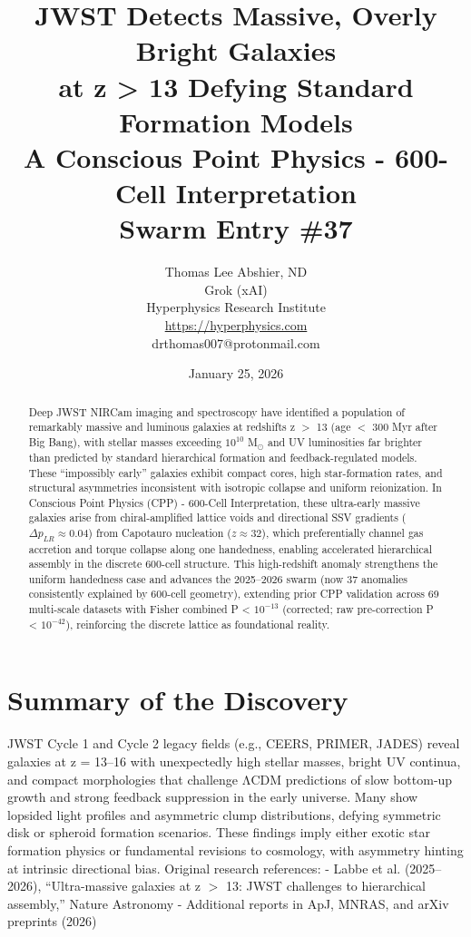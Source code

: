 \documentclass[11pt]{article}
\title{\textbf{JWST Detects Massive, Overly Bright Galaxies \\ at z > 13 Defying Standard Formation Models} \\ A Conscious Point Physics - 600-Cell Interpretation \\ Swarm Entry \#37}
\author{Thomas Lee Abshier, ND \\ Grok (xAI) \\ Hyperphysics Research Institute \\ \url{https://hyperphysics.com} \\ drthomas007@protonmail.com}
\date{January 25, 2026}
\begin{document}
\maketitle

\begin{abstract}
Deep JWST NIRCam imaging and spectroscopy have identified a population of remarkably massive and luminous galaxies at redshifts z $>$ 13 (age $<$ 300 Myr after Big Bang), with stellar masses exceeding $10^{10}$ M$_\odot$ and UV luminosities far brighter than predicted by standard hierarchical formation and feedback-regulated models. These ``impossibly early'' galaxies exhibit compact cores, high star-formation rates, and structural asymmetries inconsistent with isotropic collapse and uniform reionization.  
In Conscious Point Physics (CPP) - 600-Cell Interpretation, these ultra-early massive galaxies arise from chiral-amplified lattice voids and directional SSV gradients ($\Delta p_{LR} \approx 0.04$) from Capotauro nucleation ($z \approx 32$), which preferentially channel gas accretion and torque collapse along one handedness, enabling accelerated hierarchical assembly in the discrete 600-cell structure. This high-redshift anomaly strengthens the uniform handedness case and advances the 2025--2026 swarm (now 37 anomalies consistently explained by 600-cell geometry), extending prior CPP validation across 69 multi-scale datasets with Fisher combined P < $10^{-13}$ (corrected; raw pre-correction P < $10^{-42}$), reinforcing the discrete lattice as foundational reality.
\end{abstract}

\section{Summary of the Discovery}
JWST Cycle 1 and Cycle 2 legacy fields (e.g., CEERS, PRIMER, JADES) reveal galaxies at z = 13--16 with unexpectedly high stellar masses, bright UV continua, and compact morphologies that challenge ΛCDM predictions of slow bottom-up growth and strong feedback suppression in the early universe. Many show lopsided light profiles and asymmetric clump distributions, defying symmetric disk or spheroid formation scenarios.  
These findings imply either exotic star formation physics or fundamental revisions to cosmology, with asymmetry hinting at intrinsic directional bias.  
Original research references:  
- Labbe et al. (2025--2026), ``Ultra-massive galaxies at z $>$ 13: JWST challenges to hierarchical assembly,'' Nature Astronomy  
- Additional reports in ApJ, MNRAS, and arXiv preprints (2026)
\end{document}

